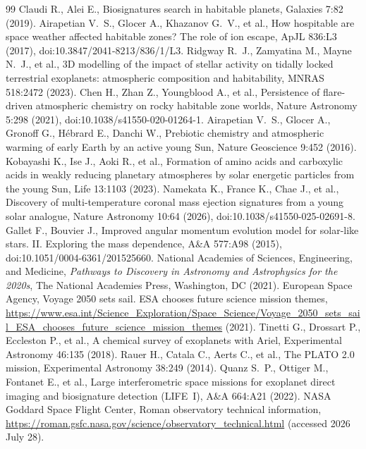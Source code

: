 \begin{thebibliography}{99}
 Claudi R., Alei E., Biosignatures search in habitable planets, Galaxies 7:82 (2019).
 Airapetian V.~S., Glocer A., Khazanov G.~V., et al., How hospitable are space weather affected habitable zones? The role of ion escape, ApJL 836:L3 (2017), doi:10.3847/2041-8213/836/1/L3.
 Ridgway R.~J., Zamyatina M., Mayne N.~J., et al., 3D modelling of the impact of stellar activity on tidally locked terrestrial exoplanets: atmospheric composition and habitability, MNRAS 518:2472 (2023).
 Chen H., Zhan Z., Youngblood A., et al., Persistence of flare-driven atmospheric chemistry on rocky habitable zone worlds, Nature Astronomy 5:298 (2021), doi:10.1038/s41550-020-01264-1.
 Airapetian V.~S., Glocer A., Gronoff G., H\'{e}brard E., Danchi W., Prebiotic chemistry and atmospheric warming of early Earth by an active young Sun, Nature Geoscience 9:452 (2016).
 Kobayashi K., Ise J., Aoki R., et al., Formation of amino acids and carboxylic acids in weakly reducing planetary atmospheres by solar energetic particles from the young Sun, Life 13:1103 (2023).
 Namekata K., France K., Chae J., et al., Discovery of multi-temperature coronal mass ejection signatures from a young solar analogue, Nature Astronomy 10:64 (2026), doi:10.1038/s41550-025-02691-8.
 Gallet F., Bouvier J., Improved angular momentum evolution model for solar-like stars. II. Exploring the mass dependence, A\&A 577:A98 (2015), doi:10.1051/0004-6361/201525660.
 National Academies of Sciences, Engineering, and Medicine, \emph{Pathways to Discovery in Astronomy and Astrophysics for the 2020s}, The National Academies Press, Washington, DC (2021).
 European Space Agency, Voyage 2050 sets sail. ESA chooses future science mission themes, \url{https://www.esa.int/Science_Exploration/Space_Science/Voyage_2050_sets_sail_ESA_chooses_future_science_mission_themes} (2021).
 Tinetti G., Drossart P., Eccleston P., et al., A chemical survey of exoplanets with Ariel, Experimental Astronomy 46:135 (2018).
 Rauer H., Catala C., Aerts C., et al., The PLATO 2.0 mission, Experimental Astronomy 38:249 (2014).
 Quanz S.~P., Ottiger M., Fontanet E., et al., Large interferometric space missions for exoplanet direct imaging and biosignature detection (LIFE~I), A\&A 664:A21 (2022).
 NASA Goddard Space Flight Center, Roman observatory technical information, \url{https://roman.gsfc.nasa.gov/science/observatory_technical.html} (accessed 2026 July 28).
\end{thebibliography}

\vspace{2mm}
